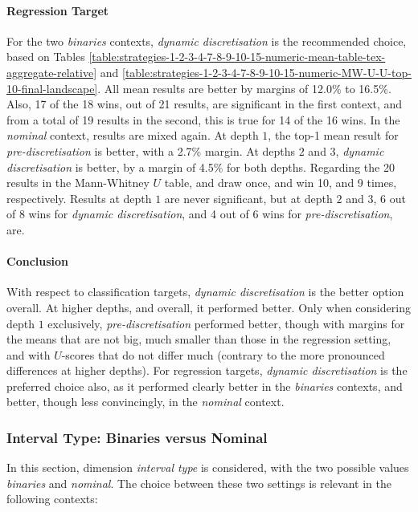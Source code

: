 \documentclass[smallextended]{svjour3}
\newcommand{\dimension}{\emph}
\newcommand{\parameter}{\emph}
\newcommand{\dyndis}{\parameter{dynamic discretisation}}
\newcommand{\predis}{\parameter{pre-discretisation}}
\newcommand{\binaries}{\parameter{binaries}}
\newcommand{\nominal}{\parameter{nominal}}
\newcommand{\dnca}[1]{\ifthenelse{\equal{#1}{0}}{7-dnca}{7-dnca\textsuperscript{#1}}}
\newcommand{\pnca}[1]{\ifthenelse{\equal{#1}{0}}{15-pnca}{15-pnca\textsuperscript{#1}}}
\begin{document}
\paragraph{Regression Target}
For the two \binaries{} contexts, \dyndis{} is the recommended choice, based on Tables \ref{table:strategies-1-2-3-4-7-8-9-10-15-numeric-mean-table-tex-aggregate-relative} and \ref{table:strategies-1-2-3-4-7-8-9-10-15-numeric-MW-U-U-top-10-final-landscape}.
All mean results are better by margins of 12.0\% to 16.5\%.
Also, 17 of the 18 wins, out of 21 results, are significant in the first context, and from a total of 19 results in the second, this is true for 14 of the 16 wins.
In the \nominal{} context, results are mixed again.
At depth $1$, the top-1 mean result for \predis{} is better, with a 2.7\% margin. 
At depths $2$ and $3$, \dyndis{} is better, by a margin of 4.5\% for both depths.
Regarding the 20 results in the Mann-Whitney $U$ table, \dnca{0} and \pnca{0} draw once, and win 10, and 9 times, respectively.
Results at depth $1$ are never significant, but at depth $2$ and $3$, 6 out of 8 wins for \dyndis{}, and 4 out of 6 wins for \predis{}, are.

\paragraph{Conclusion}
With respect to classification targets, \dyndis{} is the better option overall.
At higher depths, and overall, it performed better.
Only when considering depth $1$ exclusively, \predis{} performed better, though with margins for the means that are not big, much smaller than those in the regression setting, and with $U$-scores that do not differ much (contrary to the more pronounced differences at higher depths).
For regression targets, \dyndis{} is the preferred choice also, as it performed clearly better in the \binaries{} contexts, and better, though less convincingly, in the \nominal{} context.


\subsubsection{Interval Type: Binaries versus Nominal}
\label{section:interval-type-binaries-versus-nominal}

In this section, dimension \dimension{interval type} is considered, with the two possible values \binaries{} and \nominal{}.
The choice between these two settings is relevant in the following contexts:
\end{document}
